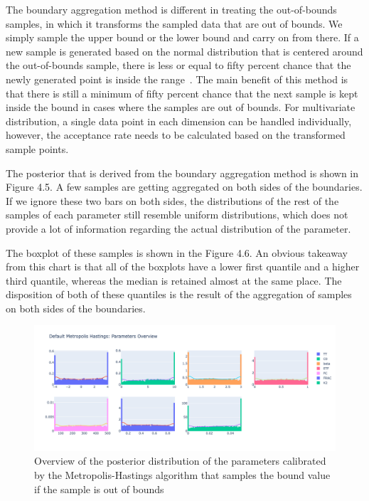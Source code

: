 The boundary aggregation method is different in treating the out-of-bounds samples, in which it transforms the sampled data that are out of bounds. We simply sample the upper bound or the lower bound and carry on from there. If a new sample is generated based on the normal distribution that is centered around the out-of-bounds sample, there is less or equal to fifty percent chance that the newly generated point is inside the range~\cite{gaussian_distribution_property}. The main benefit of this method is that there is still a minimum of fifty percent chance that the next sample is kept inside the bound in cases where the samples are out of bounds. For multivariate distribution, a single data point in each dimension can be handled individually, however, the acceptance rate needs to be calculated based on the transformed sample points. 

The posterior that is derived from the boundary aggregation method is shown in Figure 4.5.  A few samples are getting aggregated on both sides of the boundaries. If we ignore these two bars on both sides, the distributions of the rest of the samples of each parameter still resemble uniform distributions, which does not provide a lot of information regarding the actual distribution of the parameter. 

The boxplot of these samples is shown in the Figure 4.6. An obvious takeaway from this chart is that all of the boxplots have a lower first quantile and a higher third quantile, whereas the median is retained almost at the same place. The disposition of both of these quantiles is the result of the aggregation of samples on both sides of the boundaries.


\begin{figure}[H]
    \centering
    \includegraphics[width=1\textwidth]{figures/basic_mh/aggr_mh/aggr_mh_parameters_overview.png}
    \captionsetup{width=.8\textwidth}
    \caption{Overview of the posterior distribution of the parameters calibrated by the Metropolis-Hastings algorithm that samples the bound value if the sample is out of bounds}
    \label{fig:enter-label}
\end{figure}

